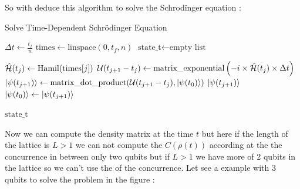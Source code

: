 So with deduce this algorithm to solve the Schrodïnger equation :
\begin{algorithm}[H]
    \caption{Solve Time-Dependent Schrödinger Equation}
    \begin{algorithmic}[1]
    \State $\Delta t \gets \frac{t_f}{n}$
    \State $\text{times} \gets \text{linspace}(0, t_f, n)$
    \State $\text{state\_t} \gets \text{empty list}$
    
        \State $\hat{\mathcal{H}}(t_j) \gets \text{Hamil(times}[j])$
        \State $\mathcal{U}(t_{j+1}-t_j) \gets \text{matrix\_exponential}\left(-i \times \hat{\mathcal{H}}(t_j) \times \Delta t \right)$
        \State $\ket{\psi(t_{j+1})} \gets \text{matrix\_dot\_product}(\mathcal{U}(t_{j+1}-t_j), \ket{\psi(t_0)})$
        \State {} $\ket{\psi(t_{j+1})}$ 
        \State $\ket{\psi(t_0)} \gets \ket{\psi(t_{j+1})}$
    \EndFor
    
    \State \Return $\text{state\_t}$
    \EndProcedure
    \end{algorithmic}
\end{algorithm}

\newpage 


Now we can compute the density matrix at the time $t$ but here if the length of the lattice is $L>1$ we can not 
compute the $C(\rho (t))$ according at the  the concurrence in between only two qubits but if $L>1$ 
we have more of 2 qubits in the lattice so we can't use the  of the concurrence. 
Let see a example with 3 qubits to solve the problem in the figure :

